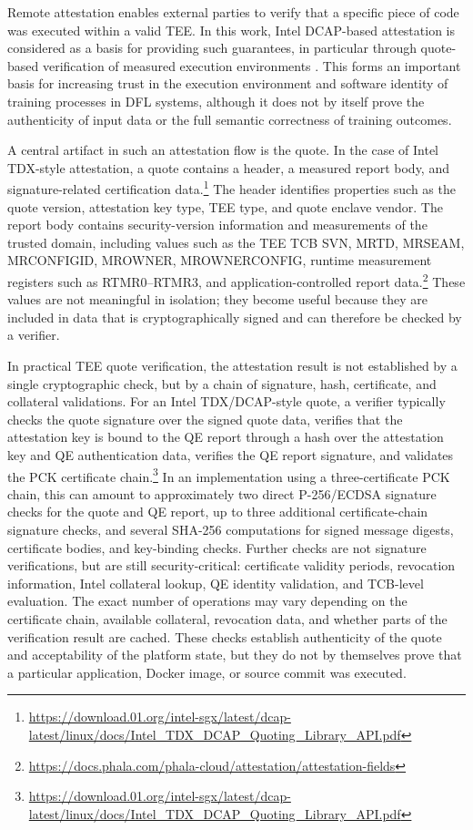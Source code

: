 Remote attestation enables external parties to verify that a specific piece of code was executed within a valid \ac{TEE}. In this work, Intel \ac{DCAP}-based attestation is considered as a basis for providing such guarantees, in particular through quote-based verification of measured execution environments \cite{10.1145/3652597}. This forms an important basis for increasing trust in the execution environment and software identity of training processes in \ac{DFL} systems, although it does not by itself prove the authenticity of input data or the full semantic correctness of training outcomes.

A central artifact in such an attestation flow is the quote. In the case of Intel TDX-style attestation, a quote contains a header, a measured report body, and signature-related certification data.\footnote{\url{https://download.01.org/intel-sgx/latest/dcap-latest/linux/docs/Intel_TDX_DCAP_Quoting_Library_API.pdf}} The header identifies properties such as the quote version, attestation key type, TEE type, and quote enclave vendor. The report body contains security-version information and measurements of the trusted domain, including values such as the \ac{TEE} \ac{TCB} \ac{SVN}, \ac{MRTD}, \ac{MRSEAM}, \ac{MRCONFIGID}, \ac{MROWNER}, \ac{MROWNERCONFIG}, runtime measurement registers such as \ac{RTMR}0--\ac{RTMR}3, and application-controlled report data.\footnote{\url{https://docs.phala.com/phala-cloud/attestation/attestation-fields}} These values are not meaningful in isolation; they become useful because they are included in data that is cryptographically signed and can therefore be checked by a verifier.

In practical \ac{TEE} quote verification, the attestation result is not established by a single cryptographic check, but by a chain of signature, hash, certificate, and collateral validations. For an Intel TDX/\ac{DCAP}-style quote, a verifier typically checks the quote signature over the signed quote data, verifies that the attestation key is bound to the \ac{QE} report through a hash over the attestation key and \ac{QE} authentication data, verifies the \ac{QE} report signature, and validates the \ac{PCK} certificate chain.\footnote{\url{https://download.01.org/intel-sgx/latest/dcap-latest/linux/docs/Intel_TDX_DCAP_Quoting_Library_API.pdf}} In an implementation using a three-certificate \ac{PCK} chain, this can amount to approximately two direct P-256/ECDSA signature checks for the quote and \ac{QE} report, up to three additional certificate-chain signature checks, and several SHA-256 computations for signed message digests, certificate bodies, and key-binding checks. Further checks are not signature verifications, but are still security-critical: certificate validity periods, revocation information, Intel collateral lookup, \ac{QE} identity validation, and \ac{TCB}-level evaluation. The exact number of operations may vary depending on the certificate chain, available collateral, revocation data, and whether parts of the verification result are cached. These checks establish authenticity of the quote and acceptability of the platform state, but they do not by themselves prove that a particular application, Docker image, or source commit was executed.

